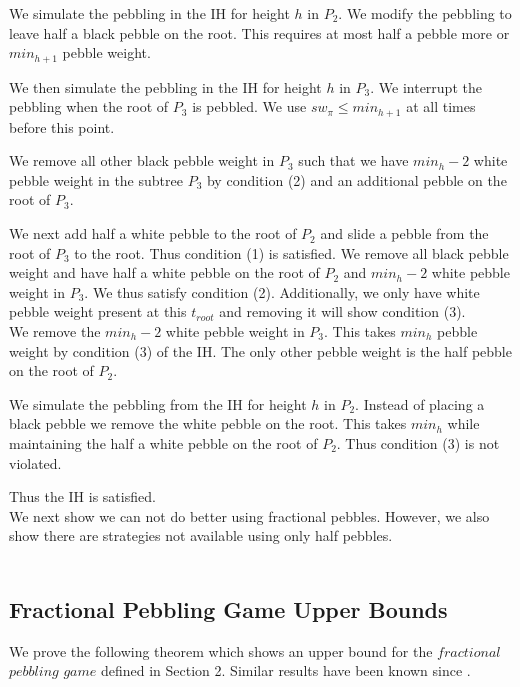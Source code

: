 \documentclass[12pt]{article}
\newcommand{\troot}{t_{root}}
\begin{document}
We simulate the pebbling in the IH for height $h$ in $P_2$. We modify the pebbling to leave half a black pebble on the root. This requires at most half a pebble more or $min_{h+1}$ pebble weight.

We then simulate the pebbling in the IH for height $h$ in $P_3$. We interrupt the pebbling when the root of $P_3$ is pebbled. We use $sw_\pi \leq min_{h+1}$ at all times before this point.

We remove all other black pebble weight in $P_3$ such that we have $min_h - 2$ white pebble weight in the subtree $P_3$ by condition (2) and an additional pebble on the root of $P_3$.

We next add half a white pebble to the root of $P_2$ and slide a pebble from the root of $P_3$ to the root. Thus condition (1) is satisfied. We remove all black pebble weight and have half a white pebble on the root of $P_2$ and $min_h-2$ white pebble weight in $P_3$. We thus satisfy condition (2). Additionally, we only have white pebble weight present at this $\troot$ and removing it will show condition (3).\\



We remove the $min_h - 2$ white pebble weight in $P_3$. This takes $min_h$ pebble weight by condition (3) of the IH. The only other pebble weight is the half pebble on the root of $P_2$.

We simulate the pebbling from the IH for height $h$ in $P_2$. Instead of placing a black pebble we remove the white pebble on the root. This takes $min_h$ while maintaining the half a white pebble on the root of $P_2$. Thus condition (3) is not violated.

Thus the IH is satisfied.\\

We next show we can not do better using fractional pebbles. However, we also show there are strategies not available using only half pebbles.\\\\





\subsection{Fractional Pebbling Game Upper Bounds} 



We prove the following theorem which shows an upper bound for the $fractional $ $pebbling$ $game$ defined in Section 2. Similar results have been known since \cite{c:pebjournal}.
\end{document}
